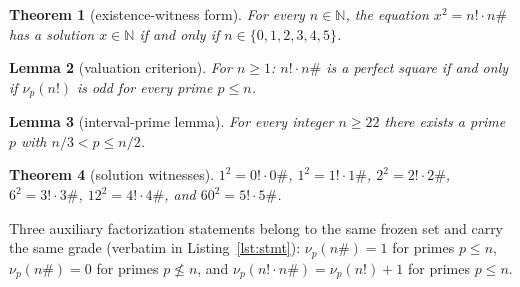 \documentclass[11pt]{article}
\newtheorem{theorem}{Theorem}
\newtheorem{lemma}[theorem]{Lemma}
\theoremstyle{definition}
\begin{document}
\begin{theorem}[existence-witness form]\label{thm:exists}
For every $n \in \mathbb{N}$, the equation $x^2 = n! \cdot n\#$ has a
solution $x \in \mathbb{N}$ if and only if $n \in \{0,1,2,3,4,5\}$.
\end{theorem}

\begin{lemma}[valuation criterion]\label{lem:A}
For $n \ge 1$: $n! \cdot n\#$ is a perfect square if and only if
$\nu_p(n!)$ is odd for every prime $p \le n$.
\end{lemma}

\begin{lemma}[interval-prime lemma]\label{lem:B}
For every integer $n \ge 22$ there exists a prime $p$ with
$n/3 < p \le n/2$.
\end{lemma}

\begin{theorem}[solution witnesses]\label{thm:witnesses}
$1^2 = 0! \cdot 0\#$, $1^2 = 1! \cdot 1\#$, $2^2 = 2! \cdot 2\#$,
$6^2 = 3! \cdot 3\#$, $12^2 = 4! \cdot 4\#$, and $60^2 = 5! \cdot 5\#$.
\end{theorem}

\noindent Three auxiliary factorization statements belong to the same frozen
set and carry the same grade (verbatim in Listing~\ref{lst:stmt}):
$\nu_p(n\#) = 1$ for primes $p \le n$, $\nu_p(n\#) = 0$ for primes
$p \nleq n$, and $\nu_p(n! \cdot n\#) = \nu_p(n!) + 1$ for primes $p \le n$.
\end{document}
